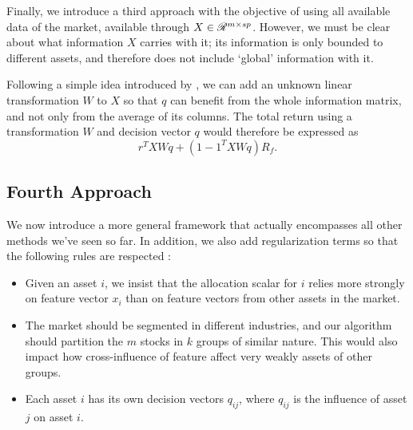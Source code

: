 Finally, we introduce a third approach with the objective of using all available data of
the market, available through $X\in\mathscr{R}^{m\times sp}$. However, we must be clear about
what information $X$ carries with it; its information is only bounded to different
assets, and therefore does not include `global' information with it.

Following a simple idea introduced by \cite{wsj}, we can add an unknown linear
transformation $W$ to $X$ so that $q$ can benefit from the whole information matrix, and
not only from the average of its columns. The total return using a transformation $W$ and
decision vector $q$ would therefore be expressed as
\begin{equation}
  r^{T}XWq + (1 - 1^{T}XWq)R_f.
\end{equation}

\subsection{Fourth Approach}

We now introduce a more general framework that actually encompasses all other methods
we've seen so far. In addition, we also add regularization terms so that the following
rules are respected :
\begin{itemize}
\item Given an asset $i$, we insist that the allocation scalar for $i$ relies more
  strongly on feature vector $x_i$ than on feature vectors from other assets in the
  market.
\item The market should be segmented in different industries, and our algorithm should
  partition the $m$ stocks in $k$ groups of similar nature. This would also impact how
  cross-influence of feature affect very weakly assets of other groups. 
\item Each asset $i$ has its own decision vectors $q_{ij}$, where $q_{ij}$ is the
  influence of asset $j$ on asset $i$. 
\end{itemize}

